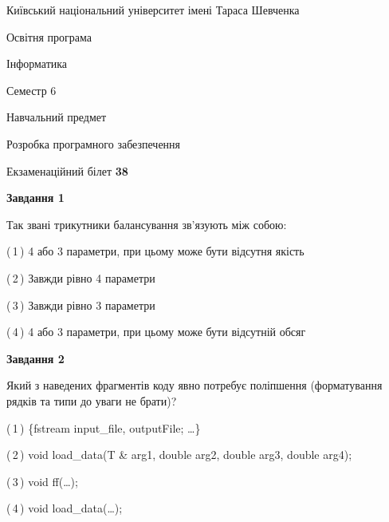 \documentclass[10pt, ukrainian]{article}
\begin{document}
{{\begin {small}\par
{ \center  Київський національний університет імені Тараса Шевченка \par}
{\parbox {5 cm}{Освітня програма \hfill}{\parbox {7 cm}{Інформатика \hfill}}\parbox {6 cm}{\hfill Семестр 6}}\par
{\parbox {5 cm} {Навчальний предмет \hfill}\parbox {7 cm}{Розробка програмного забезпечення \hfill}\parbox {6cm}{\hfill}\par}\vspace{-7pt} \end{small}}{\center Екзаменаційний білет \No \textbf
{ 38 }\par}}
{
\begin {large}
{\begin {center}\textbf{Завдання 1}\end {center}}\par
Так звані трикутники балансування зв'язують між собою:\par
\vspace{2mm}



(\,1\,) 4 або 3 параметри, при цьому може бути відсутня якість%



(\,2\,) Завжди рівно 4 параметри%



(\,3\,) Завжди рівно 3 параметри%



(\,4\,) 4 або 3 параметри, при цьому може бути відсутній обсяг %


{\begin {center}\textbf{Завдання 2}\end {center}}\par
Який з наведених фрагментів коду явно потребує поліпшення (форматування рядків та типи до уваги не брати)?\par
\vspace{2mm}



(\,1\,) \{fstream input\_file, outputFile; …\}%



(\,2\,) void load\_data(T \& arg1, double arg2, double arg3, double arg4); %



(\,3\,) void ff(…);%



(\,4\,) void load\_data(…);%



\end{large}}
\end{document}

